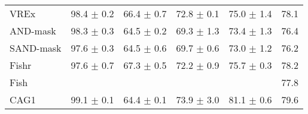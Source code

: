 \documentclass{article}
\begin{document}
\begin{center}
{\begin{tabular}{lccccc}
VREx                 & 98.4 $\pm$ 0.2       & 66.4 $\pm$ 0.7       & 72.8 $\pm$ 0.1       & 75.0 $\pm$ 1.4       & 78.1                 \\
AND-mask             & 98.3 $\pm$ 0.3       & 64.5 $\pm$ 0.2       & 69.3 $\pm$ 1.3       & 73.4 $\pm$ 1.3       & 76.4                 \\
SAND-mask            & 97.6 $\pm$ 0.3       & 64.5 $\pm$ 0.6       & 69.7 $\pm$ 0.6       & 73.0 $\pm$ 1.2       & 76.2                 \\
Fishr                & 97.6 $\pm$ 0.7       & 67.3 $\pm$ 0.5       & 72.2 $\pm$ 0.9       & 75.7 $\pm$ 0.3       & 78.2                 \\
Fish                 &                      &                      &                      &                      & 77.8                 \\
\midrule
CAG1                 & 99.1 $\pm$ 0.1       & 64.4 $\pm$ 0.1       & 73.9 $\pm$ 3.0       & 81.1 $\pm$ 0.6       & 79.6                 \\

\bottomrule
\end{tabular}}
\end{center}
\end{document}
